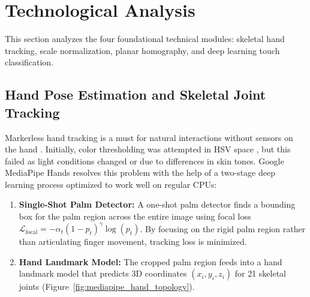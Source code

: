 \section{Technological Analysis}
\label{sec:lit_technological_analysis}
This section analyzes the four foundational technical modules: skeletal hand tracking, scale normalization, planar homography, and deep learning touch classification.

\subsection{Hand Pose Estimation and Skeletal Joint Tracking}
\label{subsec:lit_hand_pose}
Markerless hand tracking is a must for natural interactions without sensors on the hand \cite{Cui2020Deep, Zhang2020MediaPipe}. Initially, color thresholding was attempted in HSV space \cite{Ji2018Local, Khare2019QWERTY}, but this failed as light conditions changed or due to differences in skin tones. Google MediaPipe Hands \cite{Zhang2020MediaPipe} resolves this problem with the help of a two-stage deep learning process optimized to work well on regular CPUs:
\begin{enumerate}
    \item \textbf{Single-Shot Palm Detector:} A one-shot palm detector finds a bounding box for the palm region across the entire image using focal loss $\mathcal{L}_{\text{focal}} = -\alpha_t (1 - p_t)^\gamma \log(p_t)$. By focusing on the rigid palm region rather than articulating finger movement, tracking loss is minimized.
    \item \textbf{Hand Landmark Model:} The cropped palm region feeds into a hand landmark model that predicts 3D coordinates $(x_i, y_i, z_i)$ for 21 skeletal joints (Figure~\ref{fig:mediapipe_hand_topology}).
\end{enumerate}

